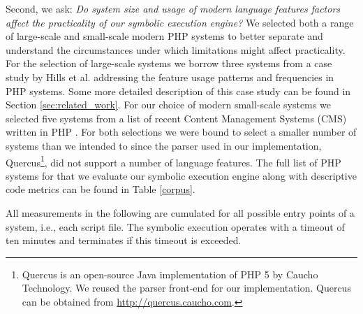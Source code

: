 \documentclass[sigconf, preprint]{acmart}
\renewcommand{\sf}[1]{\textsf{#1}}
\begin{document}
Second, we ask: \textit{Do system size and usage of modern language features
factors affect the practicality of our symbolic execution engine?} We
selected both a range of large-scale and small-scale modern PHP systems to
better separate and understand the circumstances under which limitations might affect practicality. For the selection of large-scale systems
we borrow three systems from a case study by Hills et al. \cite{hills2015variable} addressing the
feature usage patterns and frequencies in PHP systems. Some more detailed description of this
case study can be found in Section \ref{sec:related_work}. For our choice of modern small-scale systems we
selected five systems from a list of recent Content Management Systems (CMS) written in PHP \cite{codegeekz}. For both
selections we were bound to select a smaller number of systems than we intended
to since the parser used in our implementation,
\sf{Quercus}\footnote{\sf{Quercus} is an open-source Java implementation of PHP
5 by Caucho Technology. We reused the parser front-end for our implementation.
\sf{Quercus} can be obtained from \url{http://quercus.caucho.com}.}, did not
support a number of language features.
The full list of PHP systems for that we evaluate our symbolic execution engine
along with descriptive code metrics can be found in Table \ref{corpus}. 

All measurements in the following are cumulated for all possible entry points of a
system, i.e., each script file. The symbolic execution operates with a timeout
of ten minutes and terminates if this timeout is exceeded.


\end{document}
